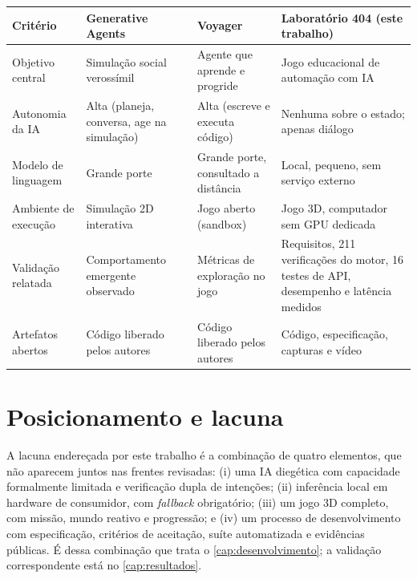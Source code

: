 \begin{quadro}[htbp]
\centering
\caption{Comparação qualitativa de propósitos entre trabalhos relacionados e o Laboratório 404.}
\label{quad:comparativo}
\footnotesize
\begin{tabular}{@{}>{\raggedright\arraybackslash}p{3.2cm} >{\raggedright\arraybackslash}p{3.4cm} >{\raggedright\arraybackslash}p{3.4cm} >{\raggedright\arraybackslash}p{3.0cm}@{}}
\toprule
Critério & Generative Agents \cite{park2023generative} & Voyager \cite{wang2023voyager} & Laboratório 404 (este trabalho) \\
\midrule
Objetivo central & Simulação social verossímil & Agente que aprende e progride & Jogo educacional de automação com IA \\
Autonomia da IA & Alta (planeja, conversa, age na simulação) & Alta (escreve e executa código) & Nenhuma sobre o estado; apenas diálogo \\
Modelo de linguagem & Grande porte & Grande porte, consultado a distância & Local, pequeno, sem serviço externo \\
Ambiente de execução & Simulação 2D interativa & Jogo aberto (sandbox) & Jogo 3D, computador sem GPU dedicada \\
Validação relatada & Comportamento emergente observado & Métricas de exploração no jogo & Requisitos, 211 verificações do motor, 16 testes de API, desempenho e latência medidos \\
Artefatos abertos & Código liberado pelos autores & Código liberado pelos autores & Código, especificação, capturas e vídeo \\
\bottomrule
\end{tabular}
\par\vspace{2pt}{\footnotesize Fonte: elaborado pelo autor (2026), a partir das referências citadas.}
\end{quadro}

\section{Posicionamento e lacuna}
\label{sec:rel_posicionamento}

A lacuna endereçada por este trabalho é a combinação de quatro elementos, que
não aparecem juntos nas frentes revisadas: (i) uma IA diegética com capacidade
formalmente limitada e verificação dupla de intenções; (ii) inferência local
em hardware de consumidor, com \emph{fallback} obrigatório; (iii) um jogo 3D
completo, com missão, mundo reativo e progressão; e (iv) um processo de
desenvolvimento com especificação, critérios de aceitação, suíte automatizada
e evidências públicas. É dessa combinação que trata o
\autoref{cap:desenvolvimento}; a validação correspondente está no
\autoref{cap:resultados}.
